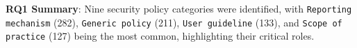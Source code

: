 
\begin{tcolorbox}[] \textbf{RQ1 Summary}:
Nine security policy categories were identified, with \texttt{Reporting mechanism} (282), \texttt{Generic policy} (211), \texttt{User guideline} (133), and \texttt{Scope of practice} (127) being the most common, highlighting their critical roles.
\end{tcolorbox}










